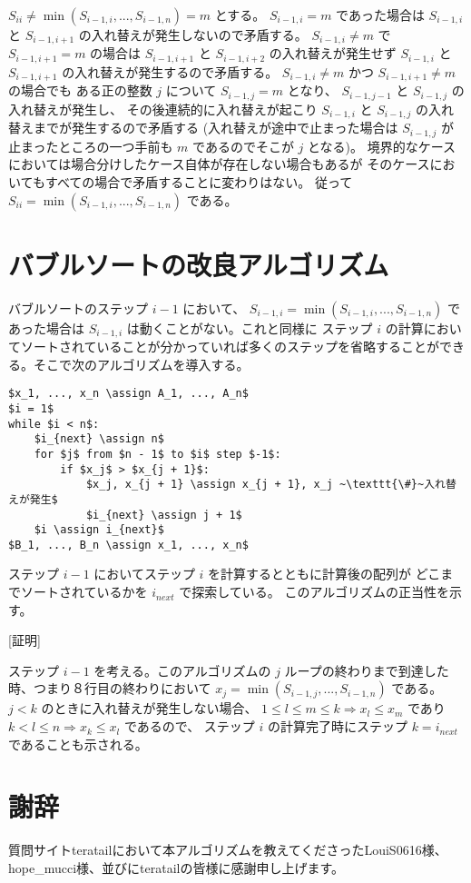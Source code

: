 \documentclass{jsarticle}
\begin{document}
$S_{ii} \ne \min (S_{i-1, i}, ..., S_{i-1, n}) = m$ とする。
$S_{i-1, i} = m$ であった場合は
$S_{i-1, i}$ と $S_{i-1, i+1}$ の入れ替えが発生しないので矛盾する。
$S_{i-1, i} \ne m$ で $S_{i-1, i+1} = m$ の場合は
$S_{i-1, i+1}$ と $S_{i-1, i+2}$ の入れ替えが発生せず
$S_{i-1, i}$ と $S_{i-1, i+1}$ の入れ替えが発生するので矛盾する。
$S_{i-1, i} \ne m$ かつ $S_{i-1, i+1} \ne m$ の場合でも
ある正の整数 $j$ について $S_{i-1, j} = m$ となり、
$S_{i-1, j-1}$ と $S_{i-1, j}$ の入れ替えが発生し、
その後連続的に入れ替えが起こり
$S_{i-1, i}$ と $S_{i-1, j}$ の入れ替えまでが発生するので矛盾する
(入れ替えが途中で止まった場合は $S_{i-1, j}$ が止まったところの一つ手前も
$m$ であるのでそこが $j$ となる)。
境界的なケースにおいては場合分けしたケース自体が存在しない場合もあるが
そのケースにおいてもすべての場合で矛盾することに変わりはない。
従って $S_{ii} = \min (S_{i-1, i}, ..., S_{i-1, n})$ である。

\section{バブルソートの改良アルゴリズム}

バブルソートのステップ $i-1$ において、
$S_{i-1, i} = \min (S_{i-1,i}, ..., S_{i-1, n})$ であった場合は
$S_{i-1, i}$ は動くことがない。これと同様に
ステップ $i$ の計算においてソートされていることが分かっていれば多くのステップを省略することができる。そこで次のアルゴリズムを導入する。

\begin{lstlisting}[mathescape]
$x_1, ..., x_n \assign A_1, ..., A_n$
$i = 1$
while $i < n$:
    $i_{next} \assign n$
    for $j$ from $n - 1$ to $i$ step $-1$:
        if $x_j$ > $x_{j + 1}$:
            $x_j, x_{j + 1} \assign x_{j + 1}, x_j ~\texttt{\#}~入れ替えが発生$
            $i_{next} \assign j + 1$
    $i \assign i_{next}$
$B_1, ..., B_n \assign x_1, ..., x_n$
\end{lstlisting}

ステップ $i-1$ においてステップ $i$ を計算するとともに計算後の配列が
どこまでソートされているかを $i_{next}$ で探索している。
このアルゴリズムの正当性を示す。

[証明]

ステップ $i-1$ を考える。このアルゴリズムの $j$ ループの終わりまで到達した時、つまり８行目の終わりにおいて $x_j = \min (S_{i-1,j}, ..., S_{i-1,n})$ である。
$j < k$ のときに入れ替えが発生しない場合、
$1 \le l \le m \le k \Longrightarrow x_l \le x_m$ であり
$k < l \le n \Longrightarrow x_k \le x_l$ であるので、
ステップ $i$ の計算完了時にステップ $k = i_{next}$ であることも示される。

\section*{謝辞}

質問サイトteratailにおいて本アルゴリズムを教えてくださったLouiS0616様、hope\_mucci様、並びにteratailの皆様に感謝申し上げます。
\end{document}
